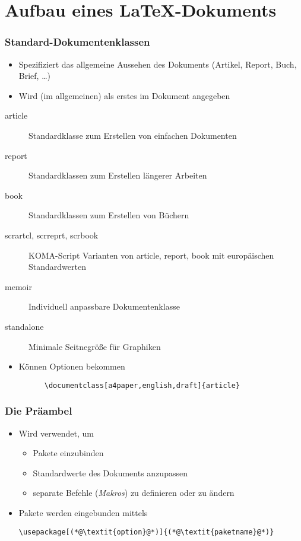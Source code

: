 
\subtitle{Einführung}
\date{Sommersemester 2017}


\section{Aufbau eines \LaTeX-Dokuments}

\begin{frame}[fragile]
  \frametitle{Standard-Dokumentenklassen}
  \begin{itemize}
    \item Spezifiziert das allgemeine Aussehen des Dokuments (Artikel, Report, Buch,
    Brief, \dots)
    \item Wird (im allgemeinen) als erstes im Dokument angegeben
  \end{itemize}  
  \begin{description}
    \item[article] Standardklasse zum Erstellen von einfachen Dokumenten
    \item[report] Standardklassen zum Erstellen längerer Arbeiten
    \item[book] Standardklassen zum Erstellen von Büchern
    \item[scrartcl, scrreprt, scrbook] KOMA-Script Varianten von article, report, book mit
      europäischen Standardwerten
    \item[memoir] Individuell anpassbare Dokumentenklasse
    \item[standalone] Minimale Seitnegröße für Graphiken
  \end{description}
  \begin{itemize}
    \item<+-> Können Optionen bekommen
    \begin{lstlisting}
      \documentclass[a4paper,english,draft]{article}
    \end{lstlisting}
  \end{itemize}
\end{frame}

\begin{frame}[fragile]
  \frametitle{Die Präambel}

  \begin{itemize}
  \item<1-> Wird verwendet, um
    \begin{itemize}
    \item<2-> Pakete einzubinden
    \item<3-> Standardwerte des Dokuments anzupassen
    \item<4-> separate Befehle (\emph{Makros}) zu definieren oder zu ändern
    \end{itemize}
  \item<2-> Pakete werden eingebunden mittels
\begin{lstlisting}
\usepackage[(*@\textit{option}@*)]{(*@\textit{paketname}@*)}
\end{lstlisting}
  \end{itemize}

\end{frame}

